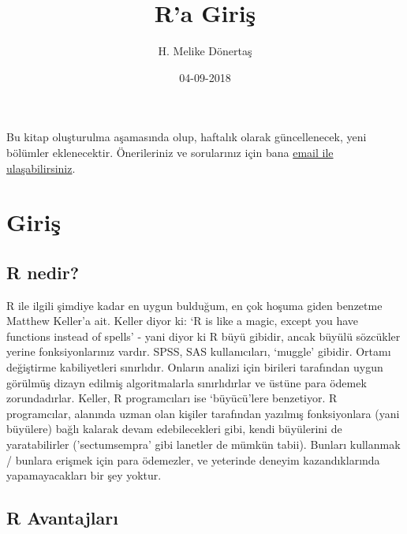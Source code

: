 \documentclass[]{book}
\title{R'a Giriş}
\author{H. Melike Dönertaş}
\date{04-09-2018}
\begin{document}
\maketitle

{
\setcounter{tocdepth}{1}
\tableofcontents
}
\hypertarget{section}{%
\chapter*{}\label{section}}

Bu kitap oluşturulma aşamasında olup, haftalık olarak güncellenecek,
yeni bölümler eklenecektir. Önerileriniz ve sorularınız için bana
\href{mailto:donertas.melike@gmail.com}{email ile ulaşabilirsiniz}.

\hypertarget{Giris}{%
\chapter{Giriş}\label{Giris}}

\hypertarget{r-nedir}{%
\section{R nedir?}\label{r-nedir}}

R ile ilgili şimdiye kadar en uygun bulduğum, en çok hoşuma giden
benzetme Matthew Keller'a ait. Keller diyor ki: `R is like a magic,
except you have functions instead of spells' - yani diyor ki R büyü
gibidir, ancak büyülü sözcükler yerine fonksiyonlarınız vardır. SPSS,
SAS kullanıcıları, `muggle' gibidir. Ortamı değiştirme kabiliyetleri
sınırlıdır. Onların analizi için birileri tarafından uygun görülmüş
dizayn edilmiş algoritmalarla sınırlıdırlar ve üstüne para ödemek
zorundadırlar. Keller, R programcıları ise `büyücü'lere benzetiyor. R
programcılar, alanında uzman olan kişiler tarafından yazılmış
fonksiyonlara (yani büyülere) bağlı kalarak devam edebilecekleri gibi,
kendi büyülerini de yaratabilirler ('sectumsempra' gibi lanetler de
mümkün tabii). Bunları kullanmak / bunlara erişmek için para ödemezler,
ve yeterinde deneyim kazandıklarında yapamayacakları bir şey yoktur.

\hypertarget{r-avantajlar}{%
\section{R Avantajları}\label{r-avantajlar}}
\end{document}
